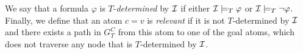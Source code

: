 We say that a formula $\varphi$ is $T$-\emph{determined} by $\mathcal{I}$ if either $\mathcal{I} \models_T \varphi$ or $\mathcal{I} \models_T \lnot \varphi$. Finally, we define that an atom $c=v$ is \emph{relevant} if it is not $T$-determined by $\mathcal{I}$ and there exists a path in $G^C_T$ from this atom to one of the goal atoms, which does not traverse any node that is $T$-determined by $\mathcal{I}$. %




